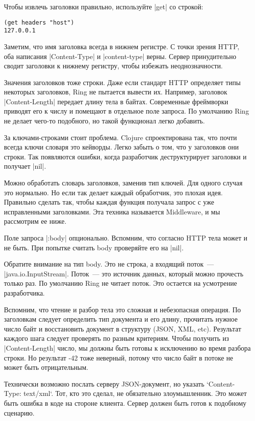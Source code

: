 Чтобы извлечь заголовки правильно, используйте \spverb|get| со строкой:

\begin{verbatim}
(get headers "host")
127.0.0.1
\end{verbatim}

Заметим, что имя заголовка всегда в нижнем регистре. С точки зрения HTTP, оба
написания \spverb|Content-Type| и \spverb|content-type| верны. Сервер принудительно сводит
заголовки к нижнему регистру, чтобы избежать неоднозначности.

Значения заголовков тоже строки. Даже если стандарт HTTP определяет типы
некоторых заголовков, Ring не пытается вывести их. Например, заголовок
\spverb|Content-Length| передает длину тела в байтах. Современные фреймворки приводят
его к числу и помещают в отдельное поле запроса. По умолчанию Ring не делает
чего-то подобного, но такой функционал легко добавить.

За ключами-строками стоит проблема. Clojure спроектирована так, что почти всегда
ключи словаря это кейворды. Легко забыть о том, что у заголовков они строки. Так
появляются ошибки, когда разработчик деструктурирует заголовки и получает \spverb|nil|.

Можно обработать словарь заголовков, заменив тип ключей. Для одного случая это
нормально. Но если так делает каждый обработчик, это плохая идея. Правильно
сделать так, чтобы каждая функция получала запрос с уже исправленными
заголовками. Эта техника называется Middleware, и мы рассмотрим ее ниже.

Поле запроса \spverb|:body| опционально. Вспомним, что согласно HTTP тела может и не
быть. При попытке считать body проверяйте его на \spverb|nil|.

Обратите внимание на тип body. Это не строка, а входящий поток~---
\spverb|java.io.InputStream|. Поток~--- это источник данных, который можно прочесть
только раз. По умолчанию Ring не читает поток. Это остается на усмотрение
разработчика.

Вспомним, что чтение и разбор тела это сложная и небезопасная операция. По
заголовкам следует определить тип документа и его длину, прочитать нужное число
байт и восстановить документ в структуру (JSON, XML, etc). Результат каждого
шага следует проверять по разным критериям. Чтобы получить из \spverb|Content-Length|
число, мы должны быть готовы к исключению во время разбора строки. Но результат
-42 тоже неверный, потому что число байт в потоке не может быть отрицательным.

Технически возможно послать серверу JSON-документ, но указать `Content-Type:
text/xml`. Тот, кто это сделал, не обязательно злоумышленник. Это может быть
ошибка в коде на стороне клиента. Сервер должен быть готов к подобному сценарию.

